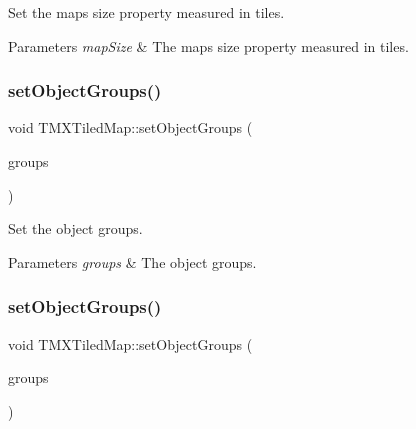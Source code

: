 Set the map\textquotesingle{}s size property measured in tiles.


\begin{DoxyParams}{Parameters}
{\em map\+Size} & The map\textquotesingle{}s size property measured in tiles. \\
\hline
\end{DoxyParams}
\mbox{\label{classTMXTiledMap_a8895880f1d29c512ba81248794844ca4}} 
\subsubsection{\texorpdfstring{set\+Object\+Groups()}{setObjectGroups()}\hspace{0.1cm}{\footnotesize\ttfamily [1/2]}}
{\footnotesize\ttfamily void T\+M\+X\+Tiled\+Map\+::set\+Object\+Groups (\begin{DoxyParamCaption}\item[{const \hyperlink{classVector}{Vector}$<$ \hyperlink{classTMXObjectGroup}{T\+M\+X\+Object\+Group} $\ast$$>$ \&}]{groups }\end{DoxyParamCaption})\hspace{0.3cm}{\ttfamily [inline]}}

Set the object groups.


\begin{DoxyParams}{Parameters}
{\em groups} & The object groups. \\
\hline
\end{DoxyParams}
\mbox{\label{classTMXTiledMap_a8895880f1d29c512ba81248794844ca4}} 
\subsubsection{\texorpdfstring{set\+Object\+Groups()}{setObjectGroups()}\hspace{0.1cm}{\footnotesize\ttfamily [2/2]}}
{\footnotesize\ttfamily void T\+M\+X\+Tiled\+Map\+::set\+Object\+Groups (\begin{DoxyParamCaption}\item[{const \hyperlink{classVector}{Vector}$<$ \hyperlink{classTMXObjectGroup}{T\+M\+X\+Object\+Group} $\ast$$>$ \&}]{groups }\end{DoxyParamCaption})\hspace{0.3cm}{\ttfamily [inline]}}

